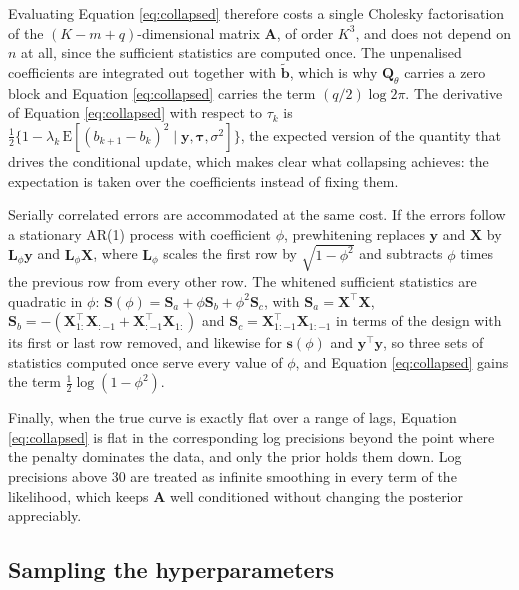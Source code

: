 \documentclass[11pt]{article}
\newcommand{\by}{\mathbf{y}}
\newcommand{\bb}{\mathbf{b}}
\newcommand{\bX}{\mathbf{X}}
\newcommand{\bQ}{\mathbf{Q}}
\newcommand{\bS}{\mathbf{S}}
\newcommand{\bA}{\mathbf{A}}
\newcommand{\btau}{\bm{\tau}}
\begin{document}
Evaluating Equation \eqref{eq:collapsed} therefore costs a single Cholesky
factorisation of the $(K - m + q)$-dimensional matrix $\bA$, of order $K^3$,
and does not depend on $n$ at all, since the sufficient statistics are
computed once. The unpenalised coefficients are integrated out together with
$\tilde{\bb}$, which is why $\bQ_\theta$ carries a zero block and
Equation \eqref{eq:collapsed} carries the term $(q/2) \log 2\pi$. The
derivative of Equation \eqref{eq:collapsed} with respect to $\tau_k$ is
$\frac{1}{2}\{1 - \lambda_k\, \mathrm{E}[(b_{k+1} - b_k)^2 \mid \by, \btau,
\sigma^2]\}$, the expected version of the quantity that drives the
conditional update, which makes clear what collapsing achieves: the
expectation is taken over the coefficients instead of fixing them.

Serially correlated errors are accommodated at the same cost. If the errors
follow a stationary AR(1) process with coefficient $\phi$, prewhitening
replaces $\by$ and $\bX$ by $\mathbf{L}_\phi \by$ and $\mathbf{L}_\phi \bX$,
where $\mathbf{L}_\phi$ scales the first row by $\sqrt{1 - \phi^2}$ and
subtracts $\phi$ times the previous row from every other row. The whitened
sufficient statistics are quadratic in $\phi$: $\bS(\phi) = \bS_a + \phi
\bS_b + \phi^2 \bS_c$, with $\bS_a = \bX^\top \bX$, $\bS_b = -(\bX_{1:}^\top
\bX_{:-1} + \bX_{:-1}^\top \bX_{1:})$ and $\bS_c = \bX_{1:-1}^\top
\bX_{1:-1}$ in terms of the design with its first or last row removed, and
likewise for $\mathbf{s}(\phi)$ and $\by^\top \by$, so three sets of
statistics computed once serve every value of $\phi$, and Equation
\eqref{eq:collapsed} gains the term $\frac{1}{2} \log (1 - \phi^2)$.

Finally, when the true curve is exactly flat over a range of lags, Equation
\eqref{eq:collapsed} is flat in the corresponding log precisions beyond the
point where the penalty dominates the data, and only the prior holds them
down. Log precisions above 30 are treated as infinite smoothing in every term
of the likelihood, which keeps $\bA$ well conditioned without changing the
posterior appreciably.

\subsection{Sampling the hyperparameters}
\label{sec:nuts}
\end{document}
